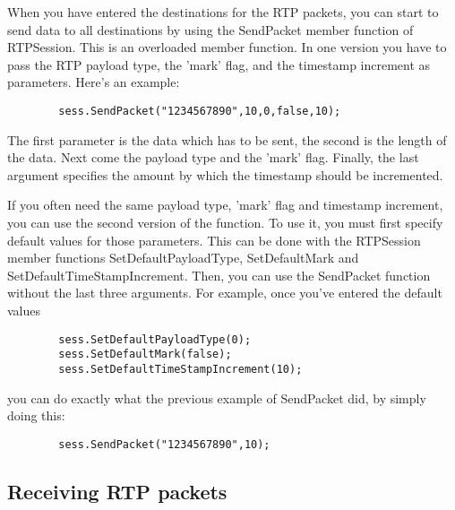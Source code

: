 When you have entered the destinations for the RTP packets, you can start to
send data to all destinations by using the SendPacket member function of
RTPSession. This is an overloaded member function. In one version you have
to pass the RTP payload type, the 'mark' flag, and the timestamp increment
as parameters. Here's an example:
        \begin{verbatim}
        sess.SendPacket("1234567890",10,0,false,10);
        \end{verbatim}
The first parameter is the data which has to be sent, the second is the length
of the data. Next come the payload type and the 'mark' flag. Finally, the last
argument specifies the amount by which the timestamp should be incremented.


If you often need the same payload type, 'mark' flag and timestamp increment,
you can use the second version of the function. To use it, you must first
specify default values for those parameters. This can be done with the
RTPSession member functions SetDefaultPayloadType, SetDefaultMark and
SetDefaultTimeStampIncrement. Then, you can use the SendPacket function without
the last three arguments. For example, once you've entered the default values
        \begin{verbatim}
        sess.SetDefaultPayloadType(0);
        sess.SetDefaultMark(false);
        sess.SetDefaultTimeStampIncrement(10);
        \end{verbatim}
you can do exactly what the previous example of SendPacket did, by simply doing
this:
        \begin{verbatim}
        sess.SendPacket("1234567890",10);
        \end{verbatim}

\subsection{Receiving RTP packets}

